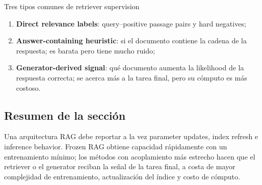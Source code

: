 
\begin{knowledgebox}{Tres tipos comunes de retriever supervision}
\begin{enumerate}
  \item \textbf{Direct relevance labels}: query--positive passage pairs y hard negatives;
  \item \textbf{Answer-containing heuristic}: si el documento contiene la cadena de la respuesta; es barata pero tiene mucho ruido;
  \item \textbf{Generator-derived signal}: qué documento aumenta la likelihood de la respuesta correcta; se acerca más a la tarea final, pero su cómputo es más costoso.
\end{enumerate}
\end{knowledgebox}


\subsection{Resumen de la sección}

Una arquitectura RAG debe reportar a la vez parameter updates, index refresh e inference behavior. Frozen RAG obtiene capacidad rápidamente con un entrenamiento mínimo; los métodos con acoplamiento más estrecho hacen que el retriever o el generator reciban la señal de la tarea final, a costa de mayor complejidad de entrenamiento, actualización del índice y costo de cómputo.
